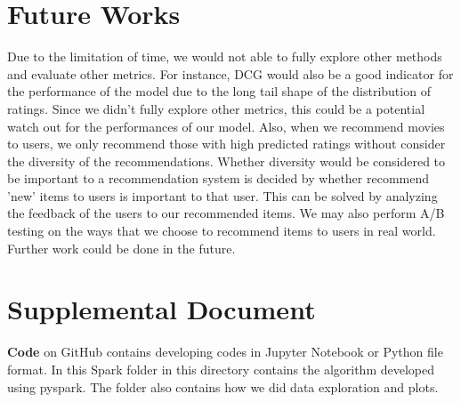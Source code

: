 \documentclass[12pt,journal,compsoc]{IEEEtran}
\begin{document}
\section{Future Works}
Due to the limitation of time, we would not able to fully explore other methods and evaluate other metrics. For instance, DCG would also be a good indicator for the performance of the model due to the long tail shape of the distribution of ratings. Since we didn't fully explore other metrics, this could be a potential watch out for the performances of our model. Also, when we recommend movies to users, we only recommend those with high predicted ratings without consider the diversity of the recommendations. Whether diversity would be considered to be important to a recommendation system is decided by whether recommend 'new' items to users is important to that user. This can be solved by analyzing the feedback of the users to our recommended items. We may also perform A/B testing on the ways that we choose to recommend items to users in real world. Further work could be done in the future.

\section{Supplemental Document}
{\bf Code} on GitHub contains developing codes in Jupyter Notebook or Python file format. In this Spark folder in this directory contains the algorithm developed using pyspark. The folder also contains how we did data exploration and plots.

\end{document}
